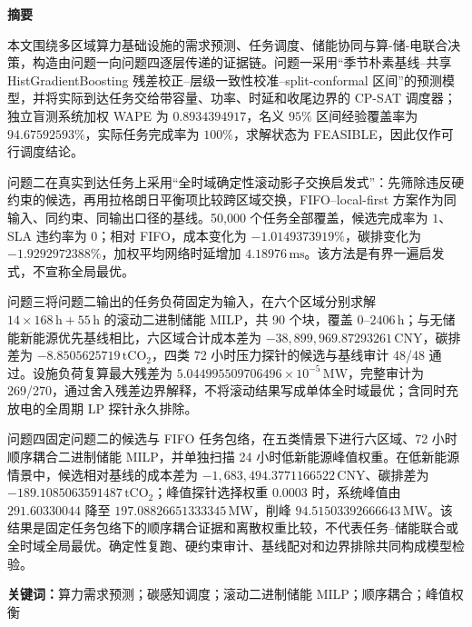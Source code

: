 \begin{center}
  {\bfseries 摘要}
\end{center}

本文围绕多区域算力基础设施的需求预测、任务调度、储能协同与算-储-电联合决策，构造由问题一向问题四逐层传递的证据链。问题一采用“季节朴素基线--共享 HistGradientBoosting 残差校正--层级一致性校准--split-conformal 区间”的预测模型，并将实际到达任务交给带容量、功率、时延和收尾边界的 CP-SAT 调度器；独立盲测系统加权 WAPE 为 $0.8934394917$，名义 $95\%$ 区间经验覆盖率为 $94.67592593\%$，实际任务完成率为 $100\%$，求解状态为 FEASIBLE，因此仅作可行调度结论。

问题二在真实到达任务上采用“全时域确定性滚动影子交换启发式”：先筛除违反硬约束的候选，再用拉格朗日平衡项比较跨区域交换，FIFO--local-first 方案作为同输入、同约束、同输出口径的基线。50,000 个任务全部覆盖，候选完成率为 $1$、SLA 违约率为 $0$；相对 FIFO，成本变化为 $-1.0149373919\%$，碳排变化为 $-1.9292972388\%$，加权平均网络时延增加 $4.18976\,\mathrm{ms}$。该方法是有界一遍启发式，不宣称全局最优。

问题三将问题二输出的任务负荷固定为输入，在六个区域分别求解 $14\times168\,\mathrm{h}+55\,\mathrm{h}$ 的滚动二进制储能 MILP，共 90 个块，覆盖 $0$--$2406\,\mathrm{h}$；与无储能新能源优先基线相比，六区域合计成本差为 $-38,899,969.87293261\,\mathrm{CNY}$，碳排差为 $-8.8505625719\,\mathrm{tCO_2}$，四类 72 小时压力探针的候选与基线审计 48/48 通过。设施负荷复算最大残差为 $5.044995509706496\times10^{-5}\,\mathrm{MW}$，完整审计为 269/270，通过舍入残差边界解释，不将滚动结果写成单体全时域最优；含同时充放电的全周期 LP 探针永久排除。

问题四固定问题二的候选与 FIFO 任务包络，在五类情景下进行六区域、72 小时顺序耦合二进制储能 MILP，并单独扫描 24 小时低新能源峰值权重。在低新能源情景中，候选相对基线的成本差为 $-1,683,494.3771166522\,\mathrm{CNY}$、碳排差为 $-189.1085063591487\,\mathrm{tCO_2}$；峰值探针选择权重 $0.0003$ 时，系统峰值由 $291.60330044$ 降至 $197.08826651333345\,\mathrm{MW}$，削峰 $94.51503392666643\,\mathrm{MW}$。该结果是固定任务包络下的顺序耦合证据和离散权重比较，不代表任务--储能联合或全时域全局最优。确定性复跑、硬约束审计、基线配对和边界排除共同构成模型检验。

\noindent\textbf{关键词：}算力需求预测；碳感知调度；滚动二进制储能 MILP；顺序耦合；峰值权衡
